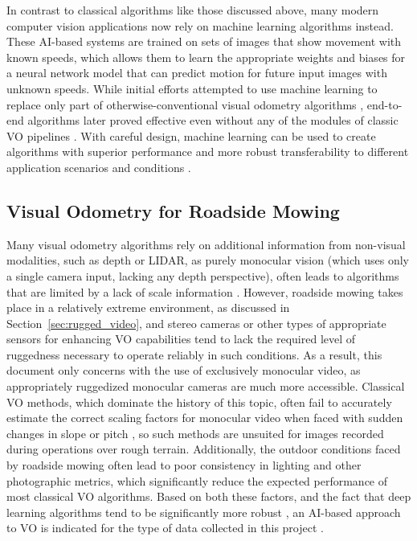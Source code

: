 \documentclass[
]{article}
\begin{document}
In contrast to classical algorithms like those discussed above, many
modern computer vision applications now rely on machine learning
algorithms instead. These AI-based systems are trained on sets of images
that show movement with known speeds, which allows them to learn the
appropriate weights and biases for a neural network model that can
predict motion for future input images with unknown speeds. While
initial efforts attempted to use machine learning to replace only part
of otherwise-conventional visual odometry algorithms
\parencite{Suenderhauf_PlaceRecognitionConvnet_2015,Konda_LearningVisualOdometry_2015},
end-to-end algorithms later proved effective even without any of the
modules of classic VO pipelines \parencite{Wang_DeepvoTowardsEnd_2017}.
With careful design, machine learning can be used to create algorithms
with superior performance \parencite{Zhan_VisualOdometryRevisited_2020}
and more robust transferability to different application scenarios and
conditions \parencite{Wang_ApproachesChallengesApplications_2022}.

\subsection{Visual Odometry for Roadside Mowing}\label{sec:vo_mow}

Many visual odometry algorithms rely on additional information from
non-visual modalities, such as depth or LIDAR, as purely monocular
vision (which uses only a single camera input, lacking any depth
perspective), often leads to algorithms that are limited by a lack of
scale information \parencite{Aqel_ReviewVisualOdometry_2016}. However,
roadside mowing takes place in a relatively extreme environment, as
discussed in Section~\ref{sec:rugged_video}, and stereo cameras or other
types of appropriate sensors for enhancing VO capabilities tend to lack
the required level of ruggedness necessary to operate reliably in such
conditions. As a result, this document only concerns with the use of
exclusively monocular video, as appropriately ruggedized monocular
cameras are much more accessible. Classical VO methods, which dominate
the history of this topic, often fail to accurately estimate the correct
scaling factors for monocular video when faced with sudden changes in
slope or pitch \parencite{Kitt_MonocularVisualOdometry_2011}, so such
methods are unsuited for images recorded during operations over rough
terrain. Additionally, the outdoor conditions faced by roadside mowing
often lead to poor consistency in lighting and other photographic
metrics, which significantly reduce the expected performance of most
classical VO algorithms. Based on both these factors, and the fact that
deep learning algorithms tend to be significantly more robust
\parencite{HerreraGranda_MonocularVisualSlam_2024}, an AI-based approach
to VO is indicated for the type of data collected in this project
\parencite{Wang_ApproachesChallengesApplications_2022}.
\end{document}
